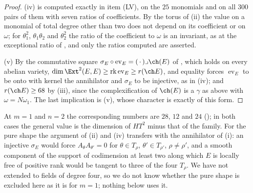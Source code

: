 \begin{proof}
(iv) is computed exactly in item (LV), on the $25$ monomials and on all $300$
pairs of them with seven ratios of coefficients. By the torus of (ii) the
value on a monomial of total degree other than two does not depend on its
coefficient or on $\omega$; for $\theta_{1}^{2}$, $\theta_{1}\theta_{2}$ and
$\theta_{2}^{2}$ the ratio of the coefficient to $\omega$ is an invariant, as
at the exceptional ratio of , and only the ratios
computed are asserted.

(v) By the commutative square $\sigma_{E}\circ\operatorname{ev}_{E}=(\,\cdot\,)
\lrcorner\ch(E)$ of , which holds on every abelian
variety, $\dim\Ext^{2}(E,E)\ge\operatorname{rk}\operatorname{ev}_{E}\ge
r(\ch E)$, and equality forces $\operatorname{ev}_{E}$ to be onto with kernel
the annihilator and $\sigma_{E}$ to be injective, as in
(iv); and $r(\ch E)\ge68$ by (iii), since the
complexification of $\ch(E)$ is a $\gamma$ as above with $\omega=N\omega_{1}$.
The last implication is (v), whose character is
exactly of this form.
\end{proof}

At $m=1$ and $n=2$ the corresponding numbers are $28$, $12$ and $24$
(); in both cases the general value is the dimension
of $HT^{2}$ minus that of the family. For the pure shape the argument of
(ii) and (iv) transfers with the annihilator of (i): an
injective $\sigma_{E}$ would force $A_{\theta}A_{\theta'}=0$ for
$\theta\in T_{\rho}$, $\theta'\in T_{\rho'}$, $\rho\ne\rho'$, and a smooth
component of the support of codimension at least two along which $E$ is
locally free of positive rank would be tangent to three of the four
$T_{\rho}$. We have not extended  to fields of degree four,
so we do not know whether the pure shape is excluded here as it is for $m=1$;
nothing below uses it.

